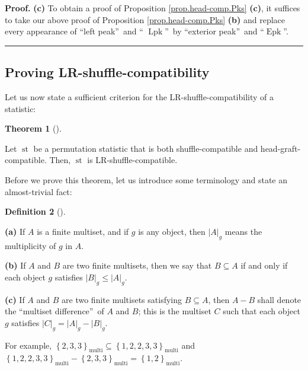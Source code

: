 \documentclass[numbers=enddot,12pt,final,onecolumn,notitlepage]{scrartcl}%
\theoremstyle{definition}
\newtheorem{theo}{Theorem}[section]
\newenvironment{theorem}[1][]
{\begin{theo}[#1]\begin{leftbar}}
{\end{leftbar}\end{theo}}
\newtheorem{defi}[theo]{Definition}
\newenvironment{definition}[1][]
{\begin{defi}[#1]\begin{leftbar}}
{\end{leftbar}\end{defi}}
\newenvironment{proof}[1][Proof]{\noindent\textbf{#1.} }{\ \rule{0.5em}{0.5em}}
\begin{document}
\begin{proof}
\textbf{(c)} To obtain a proof of Proposition \ref{prop.head-comp.Pks}
\textbf{(c)}, it suffices to take our above proof of Proposition
\ref{prop.head-comp.Pks} \textbf{(b)} and replace every appearance of
\textquotedblleft left peak\textquotedblright\ and \textquotedblleft%
$\operatorname*{Lpk}$\textquotedblright\ by \textquotedblleft exterior
peak\textquotedblright\ and \textquotedblleft$\operatorname*{Epk}%
$\textquotedblright.
\end{proof}

\subsection{Proving LR-shuffle-compatibility}

Let us now state a sufficient criterion for the LR-shuffle-compatibility of a statistic:

\begin{theorem}
\label{thm.head-comp.LRcomp}Let $\operatorname*{st}$ be a permutation
statistic that is both shuffle-compatible and head-graft-compatible. Then,
$\operatorname*{st}$ is LR-shuffle-compatible.
\end{theorem}

Before we prove this theorem, let us introduce some terminology and state an
almost-trivial fact:

\begin{definition}
\textbf{(a)} If $A$ is a finite multiset, and if $g$ is any object, then
$\left\vert A\right\vert _{g}$ means the multiplicity of $g$ in $A$.

\textbf{(b)} If $A$ and $B$ are two finite multisets, then we say that
$B\subseteq A$ if and only if each object $g$ satisfies $\left\vert
B\right\vert _{g}\leq\left\vert A\right\vert _{g}$.

\textbf{(c)} If $A$ and $B$ are two finite multisets satisfying $B\subseteq
A$, then $A-B$ shall denote the \textquotedblleft multiset
difference\textquotedblright\ of $A$ and $B$; this is the multiset $C$ such
that each object $g$ satisfies $\left\vert C\right\vert _{g}=\left\vert
A\right\vert _{g}-\left\vert B\right\vert _{g}$.
\end{definition}

For example, $\left\{  2,3,3\right\}  _{\operatorname*{multi}}\subseteq
\left\{  1,2,2,3,3\right\}  _{\operatorname*{multi}}$ and $\left\{
1,2,2,3,3\right\}  _{\operatorname*{multi}}-\left\{  2,3,3\right\}
_{\operatorname*{multi}}=\left\{  1,2\right\}  _{\operatorname*{multi}}$.
\end{document}
